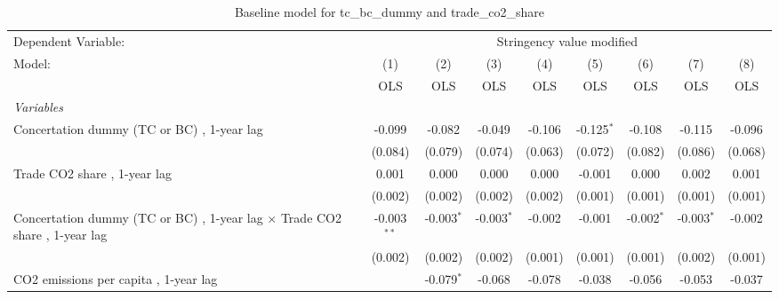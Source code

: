 
\begin{table}[htbp]
   \caption{Baseline model for tc\_bc\_dummy and trade\_co2\_share}
   \centering
   \begin{tabular}{lcccccccc}
      \toprule
      Dependent Variable: & \multicolumn{8}{c}{Stringency value modified}\\
      Model:                                                                            & (1)           & (2)          & (3)          & (4)          & (5)           & (6)           & (7)           & (8)\\  
                                                                                        &  OLS          & OLS          & OLS          & OLS          & OLS           & OLS           & OLS           & OLS\\  
      \midrule
      \emph{Variables}\\
      Concertation dummy (TC or BC) , 1-year lag                                        & -0.099        & -0.082       & -0.049       & -0.106       & -0.125$^{*}$  & -0.108        & -0.115        & -0.096\\   
                                                                                        & (0.084)       & (0.079)      & (0.074)      & (0.063)      & (0.072)       & (0.082)       & (0.086)       & (0.068)\\   
      Trade CO2 share , 1-year lag                                                      & 0.001         & 0.000        & 0.000        & 0.000        & -0.001        & 0.000         & 0.002         & 0.001\\   
                                                                                        & (0.002)       & (0.002)      & (0.002)      & (0.002)      & (0.001)       & (0.001)       & (0.001)       & (0.001)\\   
      Concertation dummy (TC or BC) , 1-year lag $\times$ Trade CO2 share , 1-year lag  & -0.003$^{**}$ & -0.003$^{*}$ & -0.003$^{*}$ & -0.002       & -0.001        & -0.002$^{*}$  & -0.003$^{*}$  & -0.002\\   
                                                                                        & (0.002)       & (0.002)      & (0.002)      & (0.001)      & (0.001)       & (0.001)       & (0.002)       & (0.001)\\   
      CO2 emissions per capita , 1-year lag                                             &               & -0.079$^{*}$ & -0.068       & -0.078       & -0.038        & -0.056        & -0.053        & -0.037\\   

\end{tabular}
\end{table}
